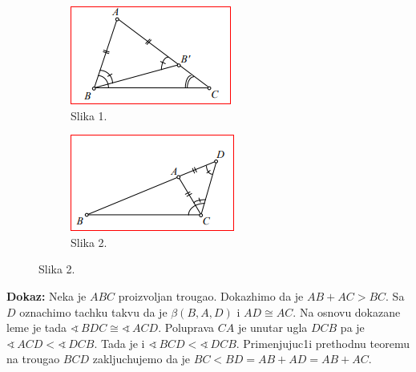 \documentclass[11pt,letter]{report}
\def\ug{\mathbin{\sphericalangle\,}}
\begin{document}
\begin{large}
\begin{flushleft}
\begin{figure}[h!]
\begin{subfigure}{0.31\textwidth}
\includegraphics[width=\linewidth]{Slike/Slika1}
\caption*{Slika 1.} 
\end{subfigure}
\hspace*{\fill}
\begin{subfigure}{0.31\textwidth}
\includegraphics[width=\linewidth]{Slike/Slika2}
\caption*{Slika 2.} 
\end{subfigure}
\end{figure}


\begin{frame}{}
\vspace{0.5cm}
\end{frame}
\textbf{Dokaz:} Neka je $ABC$ proizvoljan trougao. Dokazhimo da je $AB+AC>BC$. Sa $D$ oznachimo tachku takvu da je  $\beta(B,A,D)$ i $AD\cong AC$. Na osnovu dokazane leme je tada $\ug BDC \cong \ug ACD$. Poluprava $CA$ je unutar ugla $DCB$ pa je $\ug ACD< \ug DCB$. Tada je i $\ug BCD<\ug DCB$. Primenjujuc1i prethodnu teoremu na trougao $BCD$ zakljuchujemo da je $BC<BD=AB+AD=AB+AC$.
\newpage


\end{flushleft}
\end{large}
\end{document}
